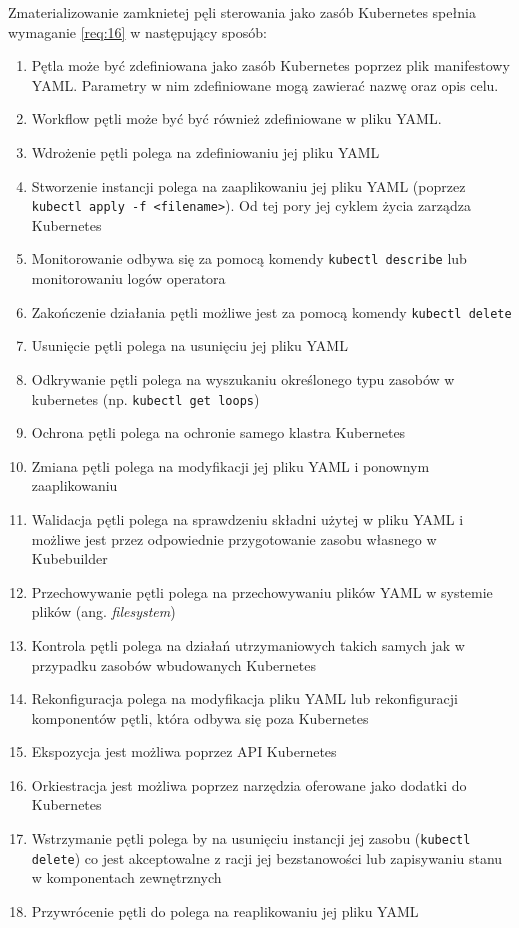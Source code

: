Zmaterializowanie zamknietej pęli sterowania jako zasób Kubernetes spełnia wymaganie \ref{req:16} w następujący sposób:
\begin{enumerate}[label=Fx.\arabic*] %
    \item Pętla może być zdefiniowana jako zasób Kubernetes poprzez plik manifestowy YAML. Parametry w nim zdefiniowane mogą zawierać nazwę oraz opis celu.
    \item Workflow pętli może być być również zdefiniowane w pliku YAML.
    \item Wdrożenie pętli polega na zdefiniowaniu jej pliku YAML
    \item Stworzenie instancji polega na zaaplikowaniu jej pliku YAML (poprzez \texttt{kubectl apply -f <filename>}). Od tej pory jej cyklem życia zarządza Kubernetes
    \item Monitorowanie odbywa się za pomocą komendy \texttt{kubectl describe} lub monitorowaniu logów operatora
    \item Zakończenie działania pętli możliwe jest za pomocą komendy \texttt{kubectl delete}
    \item Usunięcie pętli polega na usunięciu jej pliku YAML
    \item Odkrywanie pętli polega na wyszukaniu określonego typu zasobów w kubernetes (np. \texttt{kubectl get loops})
    \item Ochrona pętli polega na ochronie samego klastra Kubernetes
    \item Zmiana pętli polega na modyfikacji jej pliku YAML i ponownym zaaplikowaniu 
    \item Walidacja pętli polega na sprawdzeniu składni użytej w pliku YAML i możliwe jest przez odpowiednie przygotowanie zasobu własnego w Kubebuilder
    \item Przechowywanie pętli polega na przechowywaniu plików YAML w systemie plików (ang. \textit{filesystem})
    \item Kontrola pętli polega na działań utrzymaniowych takich samych jak w przypadku zasobów wbudowanych Kubernetes
    \item Rekonfiguracja polega na modyfikacja pliku YAML lub rekonfiguracji komponentów pętli, która odbywa się poza Kubernetes
    \item Ekspozycja jest możliwa poprzez API Kubernetes
    \item Orkiestracja jest możliwa poprzez narzędzia oferowane jako dodatki do Kubernetes
    \item Wstrzymanie pętli polega by na usunięciu instancji jej zasobu (\texttt{kubectl delete}) co jest akceptowalne z racji jej bezstanowości lub zapisywaniu stanu w komponentach zewnętrznych
    \item Przywrócenie pętli do polega na reaplikowaniu jej pliku YAML
\end{enumerate}

